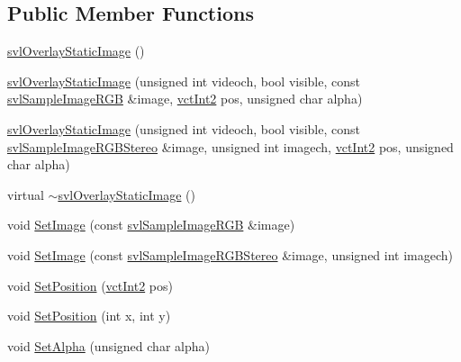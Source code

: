 \subsection*{Public Member Functions}
\begin{DoxyCompactItemize}
\item 
\hyperlink{classsvl_overlay_static_image_a16034a16d371013c7c81e1fc8fcdaf41}{svl\+Overlay\+Static\+Image} ()
\item 
\hyperlink{classsvl_overlay_static_image_a8d60b03852534484b972081fea7252c6}{svl\+Overlay\+Static\+Image} (unsigned int videoch, bool visible, const \hyperlink{svl_sample_image_types_8h_a54a55112dd3879f71f990d2945375f1a}{svl\+Sample\+Image\+R\+G\+B} \&image, \hyperlink{vct_fixed_size_vector_types_8h_add8c88eb6a432b15f14b866b9c35325f}{vct\+Int2} pos, unsigned char alpha)
\item 
\hyperlink{classsvl_overlay_static_image_afd9c8a45c6aa0f9be402106fd2b3f43d}{svl\+Overlay\+Static\+Image} (unsigned int videoch, bool visible, const \hyperlink{svl_sample_image_types_8h_a60d5c2bc1f2158093ff6588911cecc2b}{svl\+Sample\+Image\+R\+G\+B\+Stereo} \&image, unsigned int imagech, \hyperlink{vct_fixed_size_vector_types_8h_add8c88eb6a432b15f14b866b9c35325f}{vct\+Int2} pos, unsigned char alpha)
\item 
virtual \hyperlink{classsvl_overlay_static_image_a7656e74203942e9b886da47644b3c6b2}{$\sim$svl\+Overlay\+Static\+Image} ()
\item 
void \hyperlink{classsvl_overlay_static_image_a2cefc6561381eac828b1a9beaf9bbc8c}{Set\+Image} (const \hyperlink{svl_sample_image_types_8h_a54a55112dd3879f71f990d2945375f1a}{svl\+Sample\+Image\+R\+G\+B} \&image)
\item 
void \hyperlink{classsvl_overlay_static_image_a20b91c43c2c9dcc1cad04fe337dad6dc}{Set\+Image} (const \hyperlink{svl_sample_image_types_8h_a60d5c2bc1f2158093ff6588911cecc2b}{svl\+Sample\+Image\+R\+G\+B\+Stereo} \&image, unsigned int imagech)
\item 
void \hyperlink{classsvl_overlay_static_image_a75fa4808eb278c01c04011219197780b}{Set\+Position} (\hyperlink{vct_fixed_size_vector_types_8h_add8c88eb6a432b15f14b866b9c35325f}{vct\+Int2} pos)
\item 
void \hyperlink{classsvl_overlay_static_image_aa2c9039314d3d615c1add5a6f4eb2dd2}{Set\+Position} (int x, int y)
\item 
void \hyperlink{classsvl_overlay_static_image_a7ea726748d5a3b929d9d96aaf3b1f307}{Set\+Alpha} (unsigned char alpha)
\item 

\end{DoxyCompactItemize}
